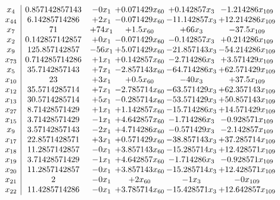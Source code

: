 \documentclass[11pt]{article}
\begin{document}
\[\begin{array}{c| c c@{\hskip 2pt} c@{\hskip 2pt} c@{\hskip 2pt} c@{\hskip 2pt} }
 x_{4}   &  0.857142857143 & -0 x_{1} & + 0.071429 x_{60} & + 0.142857 x_{3} & -1.214286 x_{109}\\
 x_{44}   &  6.14285714286 & + 2 x_{1} & -0.071429 x_{60} & -11.142857 x_{3} & + 12.214286 x_{109}\\
 x_{7}   &  71 & + 74 x_{1} & + 1.5 x_{60} & + 66 x_{3} & -37.5 x_{109}\\
 x_{2}   &  0.142857142857 & + 0 x_{1} & -0.071429 x_{60} & -0.142857 x_{3} & + 0.214286 x_{109}\\
 x_{9}   &  125.857142857 & -56 x_{1} & + 5.071429 x_{60} & -21.857143 x_{3} & -54.214286 x_{109}\\
 x_{73}   &  0.714285714286 & + 1 x_{1} & + 0.142857 x_{60} & -2.714286 x_{3} & + 3.571429 x_{109}\\
 x_{5}   &  35.7142857143 & + 7 x_{1} & -2.857143 x_{60} & -64.714286 x_{3} & + 62.571429 x_{109}\\
 x_{10}   &  23 & + 3 x_{1} & + 0.5 x_{60} & -40 x_{3} & + 37.5 x_{109}\\
 x_{12}   &  35.5714285714 & + 7 x_{1} & -2.785714 x_{60} & -63.571429 x_{3} & + 62.357143 x_{109}\\
 x_{13}   &  30.5714285714 & + 5 x_{1} & -0.285714 x_{60} & -53.571429 x_{3} & + 50.857143 x_{109}\\
 x_{27}   &  8.71428571429 & + 1 x_{1} & + 1.142857 x_{60} & -15.714286 x_{3} & + 14.571429 x_{109}\\
 x_{15}   &  3.71428571429 & -1 x_{1} & + 4.642857 x_{60} & -1.714286 x_{3} & -0.928571 x_{109}\\
 x_{9}   &  3.57142857143 & -2 x_{1} & + 4.714286 x_{60} & -0.571429 x_{3} & -2.142857 x_{109}\\
 x_{17}   &  22.8571428571 & + 3 x_{1} & + 0.571429 x_{60} & -38.857143 x_{3} & + 37.285714 x_{109}\\
 x_{18}   &  11.2857142857 & -0 x_{1} & + 3.857143 x_{60} & -15.285714 x_{3} & + 12.428571 x_{109}\\
 x_{19}   &  3.71428571429 & -1 x_{1} & + 4.642857 x_{60} & -1.714286 x_{3} & -0.928571 x_{109}\\
 x_{20}   &  11.2857142857 & -0 x_{1} & + 3.857143 x_{60} & -15.285714 x_{3} & + 12.428571 x_{109}\\
 x_{21}   &  2 & -0 x_{1} & + 2 x_{60} & -1 x_{3} & -0 x_{109}\\
 x_{22}   &  11.4285714286 & -0 x_{1} & + 3.785714 x_{60} & -15.428571 x_{3} & + 12.642857 x_{109}\\

\end{array}\]
\end{document}
